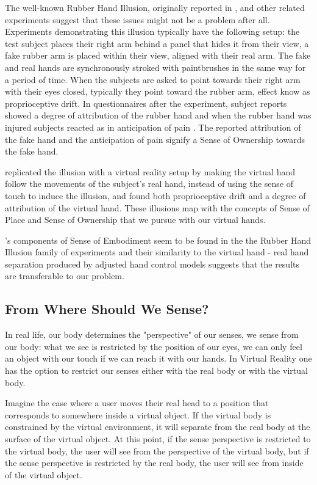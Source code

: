 The well-known Rubber Hand Illusion, originally reported in \parencite{Botvinick1998}, and other related experiments suggest that these issues might not be a problem after all. Experiments demonstrating this illusion typically have the following setup: the test subject places their right arm behind a panel that hides it from their view, a fake rubber arm is placed within their view, aligned with their real arm. The fake and real hands are synchronously stroked with paintbrushes in the same way for a period of time. When the subjects are asked to point towards their right arm with their eyes closed, typically they point toward the rubber arm, effect know as proprioceptive drift. In questionnaires after the experiment, subject reports showed a degree of attribution of the rubber hand \parencite{Botvinick1998} and when the rubber hand was injured subjects reacted as in anticipation of pain \parencite{Armel2003}. The reported attribution of the fake hand and the anticipation of pain signify a Sense of Ownership towards the fake hand.

\parencite{Sanchez-Vives2010} replicated the illusion with a virtual reality setup by making the virtual hand follow the movements of the subject's real hand, instead of using the sense of touch to induce the illusion, and found both proprioceptive drift and a degree of attribution of the virtual hand. These illusions map with the concepts of Sense of Place and Sense of Ownership that we pursue with our virtual hands.

\parencite{Kilteni2012}'s components of Sense of Embodiment seem to be found in the the Rubber Hand Illusion family of experiments and their similarity to the virtual hand - real hand separation produced by adjusted hand control models suggests that the results are transferable to our problem.

\subsection{From Where Should We Sense?}
\label{subsec:sensePerspective}

In real life, our body determines the "perspective" of our senses, we sense from our body: what we see is restricted by the position of our eyes, we can only feel an object with our touch if we can reach it with our hands. In Virtual Reality one has the option to restrict our senses either with the real body or with the virtual body. 

Imagine the case where a user moves their real head to a position that corresponds to somewhere inside a virtual object. If the virtual body is constrained by the virtual environment, it will separate from the real body at the surface of the virtual object. At this point, if the sense perspective is restricted to the virtual body, the user will see from the perspective of the virtual body, but if the sense perspective is restricted by the real body, the user will see from inside of the virtual object. 

